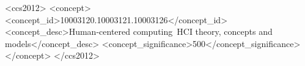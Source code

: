 \documentclass[sigchi]{acmart}
\begin{document}
\fancyhead{}
\begin{comment}
As algorithmic systems govern more aspects of our lives than ever before, their errors, biases, and misclassifications have earned them an increasingly malignant reputation.
The challenge is that algorithms must fill in the gaps between high-level policy and on-the-ground decisions, interpolating between their training data and the diverse situations seen at the margin in practice.
In this paper, we frame this challenge using the theoretical foundations of \textit{street--level bureaucracies}: how humans ``on the street'' such as police officers and judges performed the same task of bridge the gaps between high-level policy and on-the-ground decisions.
We present by analogy a theory of the algorithms that similarly bridge the gaps between policy decisions and individual human experiences: \textit{street--level algorithms}. We argue that unlike street--level bureaucrats, who refine their decision criteria as they reason through a novel or marginal situation, street--level algorithms can at best refine their decision criteria only after the decision is made. This loop-and-a-half delay results in illogical algorithmic policy decisions when handling rare cases, as in intersectional identity where specific combinations are rare, or when facing nonstationary distributions such as evolving norms.
We suggest design implications for street--level algorithms, and how they might manage the inevitable gap between policy and execution.
\end{comment}

\begin{CCSXML}
<ccs2012>
<concept>
<concept_id>10003120.10003121.10003126</concept_id>
<concept_desc>Human-centered computing~HCI theory, concepts and models</concept_desc>
<concept_significance>500</concept_significance>
</concept>
</ccs2012>
\end{CCSXML}


\maketitle



\end{document}
